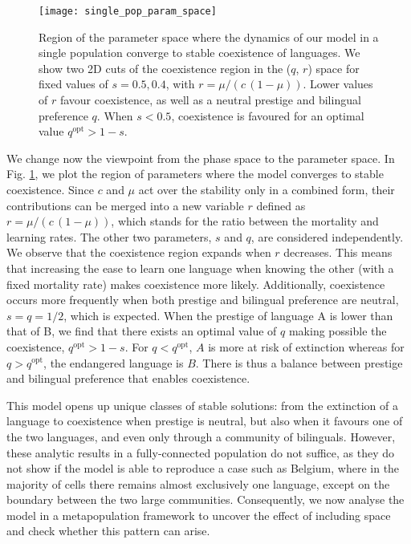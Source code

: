\documentclass[../thesis.tex]{subfiles}
\begin{document}
\begin{figure}[h]
\centering
    \texttt{[image: single\_pop\_param\_space]}
    \caption{Region of the parameter space where the dynamics of our model in a single
    population converge to stable coexistence of languages. We show two 2D cuts of the
    coexistence region in the ($q$, $r$) space for fixed values of $s=0.5, 0.4$, with $r
    = \mu / (c \, (1-\mu))$. Lower values of $r$ favour coexistence, as well as a neutral
    prestige and bilingual preference $q$. When $s < 0.5$, coexistence is favoured for an
    optimal value $q^\text{opt} > 1-s$.}
    \label{fig:coex_region}
\end{figure}

We change now the viewpoint from the phase space to the parameter space. In Fig.
\cref{fig:coex_region}, we plot the region of parameters where the model converges to
stable coexistence. Since $c$ and $\mu$ act over the stability only in a combined form,
their contributions can be merged into a new variable $r$ defined as $r = \mu/(c \,
(1-\mu))$, which stands for the ratio between the mortality and learning rates. The
other two parameters, $s$ and $q$, are considered independently. We observe that the
coexistence region expands when $r$ decreases. This means that increasing the ease to
learn one language when knowing the other (with a fixed mortality rate) makes
coexistence more likely. Additionally, coexistence occurs more frequently when both
prestige and bilingual preference are neutral, $s = q = 1/2$, which is expected. When
the prestige of language A is lower than that of B, we find that there exists an optimal
value of $q$ making possible the coexistence, $q^\text{opt} > 1-s$. For $q <
q^\text{opt}$, $A$ is more at risk of extinction whereas for $q > q^\text{opt}$, the
endangered language is $B$. There is thus a balance between prestige and bilingual
preference that enables coexistence. 

This model opens up unique classes of stable solutions: from the extinction of a
language to coexistence when prestige is neutral, but also when it favours one of the two
languages, and even only through a community of bilinguals. However, these analytic
results in a fully-connected population do not suffice, as they do not show if the model
is able to reproduce a case such as Belgium, where in the majority of cells there
remains almost exclusively one language, except on the boundary between the two large
communities. Consequently, we now analyse the model in a metapopulation framework to
uncover the effect of including space and check whether this pattern can arise.
\end{document}
